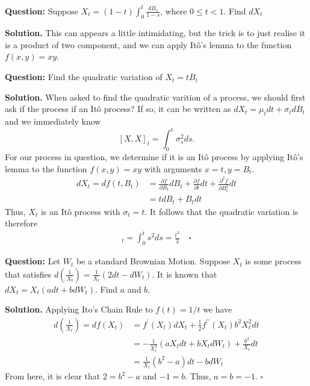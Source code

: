 \documentclass{article}
\begin{document}
\begin{tcolorbox}[colframe=black,colback=gray!5,boxrule=0.5pt]
\textbf{Question:} Suppose $X_t = (1-t)\int_0^t\frac{dB_s}{1-s}$, where $0\leq t<1$. Find $dX_t$
\end{tcolorbox}
\textbf{Solution.} This can appears a little intimidating, but the trick is to just realise it is a product of two component, and we can apply Itô's lemma to the function $f(x,y) = xy$.


\begin{tcolorbox}[colframe=black,colback=gray!5,boxrule=0.5pt]
\textbf{Question:} Find the quadratic variation of $X_t = tB_t$
\end{tcolorbox}
\textbf{Solution.} When asked to find the quadratic varition of a process, we should first ask if the process if an Itô process? If so, it can be written as $dX_t = \mu_t dt + \sigma_t dB_t$ and we immediately know 
$$[X, X]_t = \int_0^t\sigma_s^2ds.$$
For our process in question, we determine if it is an Itô process by applying Itô's lemma to the function $f(x,y) = xy$ with arguments $x=t, y=B_t$. 
\begin{align*}
    dX_t = df(t,B_t) &= \frac{\partial f}{\partial B_t}dB_t + \frac{\partial f}{\partial t}dt + \frac{\partial^2 f}{\partial B_t^2}dt \\
    &=tdB_t + B_tdt
\end{align*}
Thus, $X_t$ is an Itô process with $\sigma_t = t$. It follows that the quadratic variation is therefore
\begin{align*}
    [X,X]_t = \int_0^t s^2ds = \frac{t^3}{3} \quad \square
\end{align*}

\begin{tcolorbox}[colframe=black,colback=gray!5,boxrule=0.5pt]
\textbf{Question:} Let $W_t$ be a standard Brownian Motion. Suppose $X_t$ is some process that satisfies $d(\frac{1}{X_t}) = \frac{1}{X_t}(2dt-dW_t)$. It is known that $dX_t = X_t(adt + bdW_t)$. Find $a$ and $b$.
\end{tcolorbox}
\textbf{Solution.} Applying Ito's Chain Rule to $f(t) = 1/t$ we have 
\begin{align*}
    d\left(\frac{1}{X_t}\right) = df(X_t) &=  f^\prime(X_t)dX_t + \frac{1}{2}f^{\prime\prime}(X_t)b^2X_t^2dt \\
    &= -\frac{1}{X_t^2}(aX_tdt + bX_tdW_t) + \frac{b^2}{X_t}dt \\
&= \frac{1}{X_t}(b^2-a)dt-bdW_t
\end{align*}
From here, it is clear that $2 = b^2-a$ and $-1 = b$. Thus, $a=b=-1$. $\square$
\end{document}
